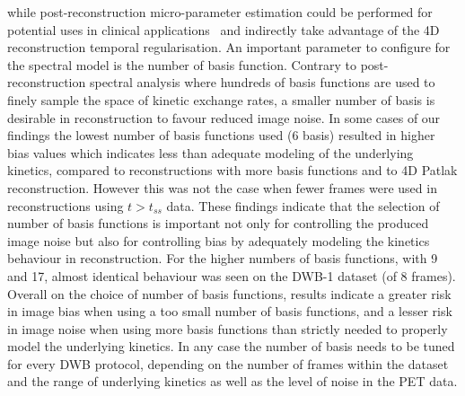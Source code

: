while post-reconstruction micro-parameter estimation could be performed for potential uses in clinical applications~\cite{Novosad2016b,Zaker2020} and indirectly take advantage of the 4D reconstruction temporal regularisation.
An important parameter to configure for the spectral model is the number of basis function. 
Contrary to post-reconstruction spectral analysis where hundreds of basis functions are used to finely sample the space of kinetic exchange rates, a smaller number of basis is desirable in reconstruction to favour reduced image noise.
In some cases of our findings the lowest number of basis functions used (6 basis) resulted in higher bias values which indicates less than adequate modeling of the underlying kinetics, compared to reconstructions with more basis functions and to 4D Patlak reconstruction. However this was not the case when fewer frames were used in reconstructions using $t>t_{ss}$ data. 
These findings indicate that the selection of number of basis functions is important not only for controlling the produced image noise but also for controlling bias by adequately modeling the kinetics behaviour in reconstruction. 
For the higher numbers of basis functions, with 9 and 17, almost identical behaviour was seen on the DWB-1 dataset (of 8 frames). 
Overall on the choice of number of basis functions, results indicate a greater risk in image bias when using a too small number of basis functions, and a lesser risk in image noise when using more basis functions than strictly needed to properly model the underlying kinetics.
In any case the number of basis needs to be tuned for every DWB protocol, depending on the number of frames within the dataset and the range of underlying kinetics as well as the level of noise in the PET data.

